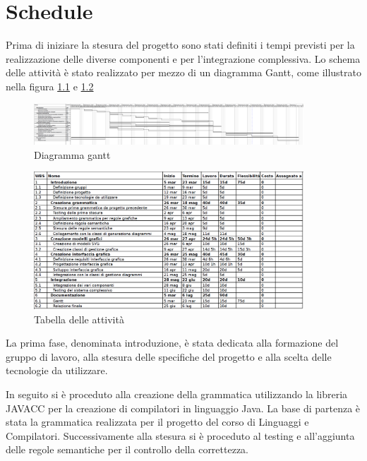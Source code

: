 \chapter{Schedule}

Prima di iniziare la stesura del progetto sono stati definiti i tempi previsti
per la realizzazione delle diverse componenti e per l'integrazione complessiva.
Lo schema delle attività è stato realizzato per mezzo di un diagramma Gantt,
come illustrato nella figura \ref{gantt-diagram} e \ref{gantt-table}

\begin{figure}[htp, label={gantt-diagram}]
\begin{center}
  \includegraphics[width=0.9\textwidth]{img/gantt}
  \caption[labelInTOC]{Diagramma gantt}
  \label{gantt-diagram}
\end{center}
\end{figure}

\begin{figure}[htp, label={gantt-table}]
\begin{center}
  \includegraphics[width=0.9\textwidth]{img/gantt-table}
  \caption[labelInTOC]{Tabella delle attività}
  \label{gantt-table}
\end{center}
\end{figure}

La prima fase, denominata introduzione, è stata dedicata alla formazione del
gruppo di lavoro, alla stesura delle specifiche del progetto e alla scelta delle
tecnologie da utilizzare.

In seguito si è proceduto alla creazione della grammatica utilizzando la
libreria JAVACC per la creazione di compilatori in linguaggio Java. La base di
partenza è stata la grammatica realizzata per il progetto del corso di Linguaggi
e Compilatori. Successivamente alla stesura si è proceduto al testing e
all'aggiunta delle regole semantiche per il controllo della correttezza.

